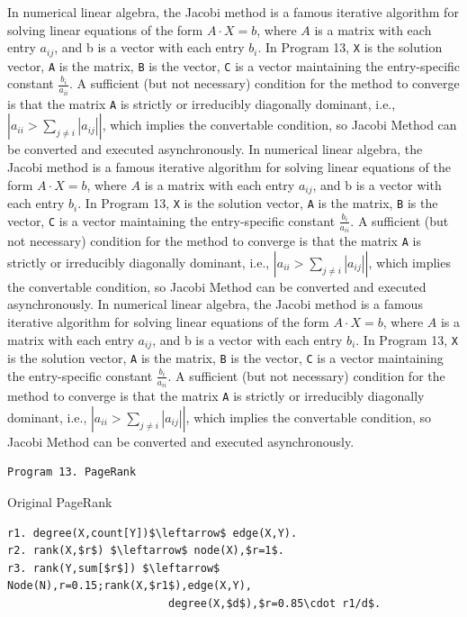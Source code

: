 \begin{appendix}
 In numerical linear algebra, the Jacobi method is a famous iterative algorithm for solving linear equations of the form $A\cdot X=b$, where $A$ is a matrix with each entry $a_{ij}$, and b is a vector with each entry $b_i$. In Program 13, \texttt{X} is the solution vector, \texttt{A} is the matrix, \texttt{B} is the vector, \texttt{C} is a vector maintaining the entry-specific constant $\frac{b_i}{a_{ii}}$. A sufficient (but not necessary) condition for the method to converge is that the matrix \texttt{A} is strictly or irreducibly diagonally dominant, i.e., $|a_{ii}>\sum_{j\neq i}{|a_{ij}|}|$, which implies the convertable condition, so Jacobi Method can be converted and executed asynchronously.
  In numerical linear algebra, the Jacobi method is a famous iterative algorithm for solving linear equations of the form $A\cdot X=b$, where $A$ is a matrix with each entry $a_{ij}$, and b is a vector with each entry $b_i$. In Program 13, \texttt{X} is the solution vector, \texttt{A} is the matrix, \texttt{B} is the vector, \texttt{C} is a vector maintaining the entry-specific constant $\frac{b_i}{a_{ii}}$. A sufficient (but not necessary) condition for the method to converge is that the matrix \texttt{A} is strictly or irreducibly diagonally dominant, i.e., $|a_{ii}>\sum_{j\neq i}{|a_{ij}|}|$, which implies the convertable condition, so Jacobi Method can be converted and executed asynchronously.
   In numerical linear algebra, the Jacobi method is a famous iterative algorithm for solving linear equations of the form $A\cdot X=b$, where $A$ is a matrix with each entry $a_{ij}$, and b is a vector with each entry $b_i$. In Program 13, \texttt{X} is the solution vector, \texttt{A} is the matrix, \texttt{B} is the vector, \texttt{C} is a vector maintaining the entry-specific constant $\frac{b_i}{a_{ii}}$. A sufficient (but not necessary) condition for the method to converge is that the matrix \texttt{A} is strictly or irreducibly diagonally dominant, i.e., $|a_{ii}>\sum_{j\neq i}{|a_{ij}|}|$, which implies the convertable condition, so Jacobi Method can be converted and executed asynchronously.
  \begin{verbatim}
Program 13. PageRank
\end{verbatim}\small
Original PageRank
\begin{lstlisting}
r1. degree(X,count[Y])$\leftarrow$ edge(X,Y).
r2. rank(X,$r$) $\leftarrow$ node(X),$r=1$.
r3. rank(Y,sum[$r$]) $\leftarrow$ Node(N),r=0.15;rank(X,$r1$),edge(X,Y),
                         degree(X,$d$),$r=0.85\cdot r1/d$.
\end{lstlisting}


\end{appendix}
